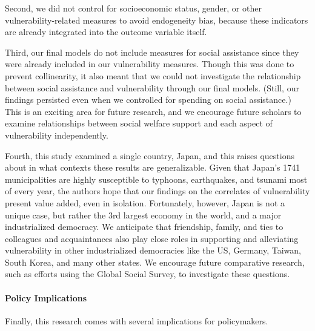 \documentclass[]{elsarticle} %
\begin{document}
Second, we did not control for socioeconomic status, gender, or other
vulnerability-related measures to avoid endogeneity bias, because these
indicators are already integrated into the outcome variable itself.

Third, our final models do not include measures for social assistance
since they were already included in our vulnerability measures. Though
this was done to prevent collinearity, it also meant that we could not
investigate the relationship between social assistance and vulnerability
through our final models. (Still, our findings persisted even when we
controlled for spending on social assistance.) This is an exciting area
for future research, and we encourage future scholars to examine
relationships between social welfare support and each aspect of
vulnerability independently.

Fourth, this study examined a single country, Japan, and this raises
questions about in what contexts these results are generalizable. Given
that Japan's 1741 municipalities are highly susceptible to typhoons,
earthquakes, and tsunami most of every year, the authors hope that our
findings on the correlates of vulnerability present value added, even in
isolation. Fortunately, however, Japan is not a unique case, but rather
the 3rd largest economy in the world, and a major industrialized
democracy. We anticipate that friendship, family, and ties to colleagues
and acquaintances also play close roles in supporting and alleviating
vulnerability in other industrialized democracies like the US, Germany,
Taiwan, South Korea, and many other states. We encourage future
comparative research, such as efforts using the Global Social Survey, to
investigate these questions.

\hypertarget{policy-implications}{%
\paragraph{Policy Implications}\label{policy-implications}}

Finally, this research comes with several implications for policymakers.
\end{document}
